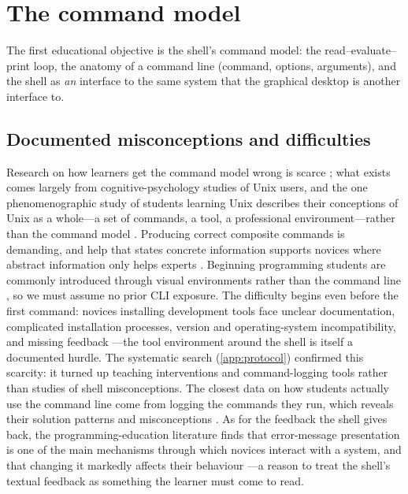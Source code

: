 \mode*
\section{The command model}
\label{sec:shell}

The first educational objective is the shell's command model: the
read--evaluate--print loop, the anatomy of a command line (command,
options, arguments), and the shell as \emph{an} interface to the same
system that the graphical desktop is another interface to.

\subsection{Documented misconceptions and difficulties}

Research on how learners get the command model wrong is scarce
\autocite{Winder2024ShellTutor}; what exists comes largely from
cognitive-psychology studies of Unix users, and the one phenomenographic
study of students learning Unix describes their conceptions of Unix as a
whole---a set of commands, a tool, a professional environment---rather
than the command model \autocite{DoyleLister2006Unix}.
Producing correct composite commands is demanding, and help that states
concrete information supports novices where abstract information only helps
experts \autocite{Doane1992UnixPrompts}.
Beginning programming students are commonly introduced through visual
environments rather than the command line \autocite{Dillon2012MentalModels},
so we must assume no prior CLI exposure.
The difficulty begins even before the first command: novices installing
development tools face unclear documentation, complicated installation
processes, version and operating-system incompatibility, and missing
feedback \autocite{Salerno2026ToolInstallation}---the tool environment
around the shell is itself a documented hurdle.
The systematic search (\cref{app:protocol}) confirmed this scarcity: it
turned up teaching interventions and command-logging tools rather than
studies of shell misconceptions.
The closest data on how students actually use the command line come from
logging the commands they run, which reveals their solution patterns and
misconceptions \autocite{Svabensky2021ShellCommands}.
As for the feedback the shell gives back, the programming-education
literature finds that error-message presentation is one of the main
mechanisms through which novices interact with a system, and that changing it
markedly affects their behaviour \autocite{Karvelas2020ErrorMessages}---a
reason to treat the shell's textual feedback as something the learner must
come to read.

